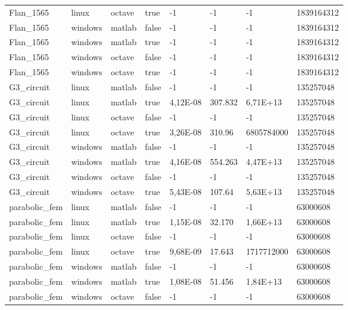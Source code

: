 \begin{small}
\begin{longtable}{|l|l|l|l|l|l|l|l|}
Flan\_1565      & linux   & octave & true  & -1         & -1       & -1         & 1839164312 \\
Flan\_1565      & windows & matlab & false & -1         & -1       & -1         & 1839164312 \\
Flan\_1565      & windows & matlab & true  & -1         & -1       & -1         & 1839164312 \\
Flan\_1565      & windows & octave & false & -1         & -1       & -1         & 1839164312 \\
Flan\_1565      & windows & octave & true  & -1         & -1       & -1         & 1839164312 \\
G3\_circuit     & linux   & matlab & false & -1         & -1       & -1         & 135257048  \\
G3\_circuit     & linux   & matlab & true  & 4,12E-08   & 307.832  & 6,71E+13   & 135257048  \\
G3\_circuit     & linux   & octave & false & -1         & -1       & -1         & 135257048  \\
G3\_circuit     & linux   & octave & true  & 3,26E-08   & 310.96   & 6805784000 & 135257048  \\
G3\_circuit     & windows & matlab & false & -1         & -1       & -1         & 135257048  \\
G3\_circuit     & windows & matlab & true  & 4,16E-08   & 554.263  & 4,47E+13   & 135257048  \\
G3\_circuit     & windows & octave & false & -1         & -1       & -1         & 135257048  \\
G3\_circuit     & windows & octave & true  & 5,43E-08   & 107.64   & 5,63E+13   & 135257048  \\
parabolic\_fem  & linux   & matlab & false & -1         & -1       & -1         & 63000608   \\
parabolic\_fem  & linux   & matlab & true  & 1,15E-08   & 32.170   & 1,66E+13   & 63000608   \\
parabolic\_fem  & linux   & octave & false & -1         & -1       & -1         & 63000608   \\
parabolic\_fem  & linux   & octave & true  & 9,68E-09   & 17.643   & 1717712000 & 63000608   \\
parabolic\_fem  & windows & matlab & false & -1         & -1       & -1         & 63000608   \\
parabolic\_fem  & windows & matlab & true  & 1,08E-08   & 51.456   & 1,84E+13   & 63000608   \\
parabolic\_fem  & windows & octave & false & -1         & -1       & -1         & 63000608   \\

\end{longtable}
\end{small}
